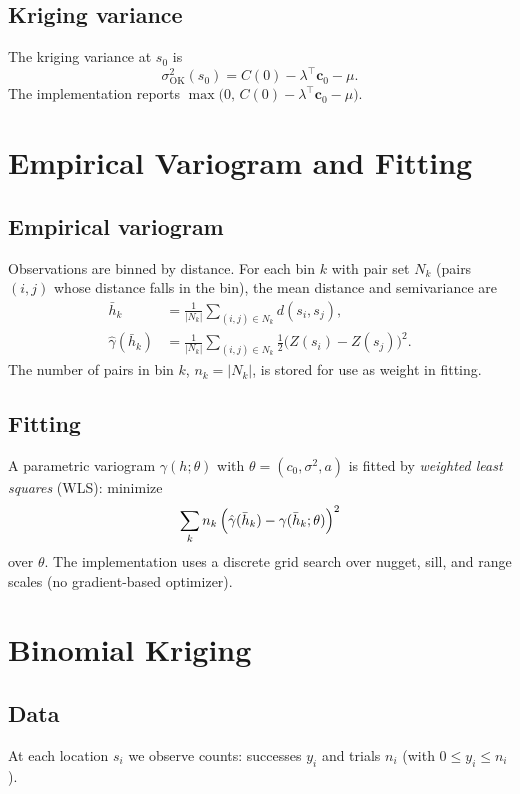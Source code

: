 \documentclass[11pt]{article}
\begin{document}
\subsection{Kriging variance}
The kriging variance at $s_0$ is
\begin{equation}
  \sigma_{\mathrm{OK}}^2(s_0) = C(0) - \lambda^\top \mathbf{c}_0 - \mu.
\end{equation}
The implementation reports $\max\bigl(0, \, C(0) - \lambda^\top \mathbf{c}_0 - \mu\bigr)$.

\section{Empirical Variogram and Fitting}

\subsection{Empirical variogram}
Observations are binned by distance. For each bin $k$ with pair set $N_k$ (pairs $(i,j)$ whose distance falls in the bin), the mean distance and semivariance are
\begin{align}
  \bar{h}_k &= \frac{1}{|N_k|} \sum_{(i,j) \in N_k} d(s_i, s_j), \\
  \hat{\gamma}(\bar{h}_k) &= \frac{1}{|N_k|} \sum_{(i,j) \in N_k} \frac{1}{2}\bigl(Z(s_i) - Z(s_j)\bigr)^2.
\end{align}
The number of pairs in bin $k$, $n_k = |N_k|$, is stored for use as weight in fitting.

\subsection{Fitting}
A parametric variogram $\gamma(h; \theta)$ with $\theta = (c_0, \sigma^2, a)$ is fitted by \emph{weighted least squares} (WLS): minimize
\begin{equation}
  \sum_k n_k\,\Bigl(\hat{\gamma}(\bar{h}_k) - \gamma(\bar{h}_k; \theta)\Bigr)^2
\end{equation}
over $\theta$. The implementation uses a discrete grid search over nugget, sill, and range scales (no gradient-based optimizer).

\section{Binomial Kriging}

\subsection{Data}
At each location $s_i$ we observe counts: successes $y_i$ and trials $n_i$ (with $0 \le y_i \le n_i$).
\end{document}
